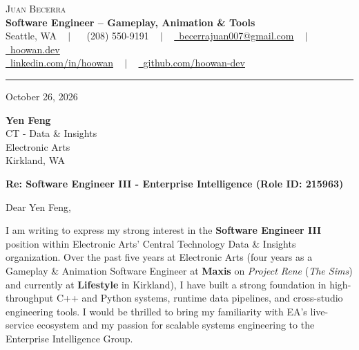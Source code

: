 \documentclass[letterpaper,11pt]{article}
\begin{document}
\begin{center}
    {\Huge \scshape Juan Becerra} \\ \vspace{4pt}
    \textbf{\large Software Engineer -- Gameplay, Animation \& Tools} \\ \vspace{4pt}
    \small Seattle, WA ~ $|$ ~
    \raisebox{-0.1\height}\faPhone\ (208) 550-9191 ~ $|$ ~
    \href{mailto:becerrajuan007@gmail.com}{\raisebox{-0.2\height}\faEnvelope\ \underline{becerrajuan007@gmail.com}} ~ $|$ ~
    \href{https://hoowan.dev}{\raisebox{-0.2\height}\faGlobe\ \underline{hoowan.dev}} \\ \vspace{2pt}
    \href{https://linkedin.com/in/hoowan/}{\raisebox{-0.2\height}\faLinkedin\ \underline{linkedin.com/in/hoowan}} ~ $|$ ~
    \href{https://github.com/hoowan-dev}{\raisebox{-0.2\height}\faGithub\ \underline{github.com/hoowan-dev}}
\end{center}

\vspace{4pt}
\hrule
\vspace{14pt}

\noindent October 26, 2026

\vspace{8pt}
\noindent \textbf{Yen Feng} \\
CT - Data \& Insights \\
Electronic Arts \\
Kirkland, WA

\vspace{8pt}
\noindent \textbf{Re: Software Engineer III - Enterprise Intelligence (Role ID: 215963)}

\vspace{8pt}
\noindent Dear Yen Feng,

I am writing to express my strong interest in the \textbf{Software Engineer III} position within 
Electronic Arts' Central Technology Data \& Insights organization. Over the past five years at 
Electronic Arts (four years as a Gameplay \& Animation Software Engineer at \textbf{Maxis} on 
\emph{Project Rene} (\emph{The Sims}) and currently at \textbf{Lifestyle} in Kirkland), I have 
built a strong foundation in high-throughput C++ and Python systems, runtime data pipelines, 
and cross-studio engineering tools. I would be thrilled to bring my familiarity with EA's 
live-service ecosystem and my passion for scalable systems engineering to the Enterprise 
Intelligence Group.
\end{document}
